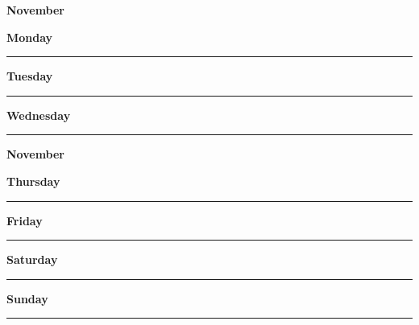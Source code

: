 \newpage

\textbf{\Large{November} \hfill \Large{}}
\vspace{0.3cm}

\begin{daybox}
 \textbf{Monday} \\
\rule{\linewidth}{0.02cm}
\end{daybox}

\begin{daybox}
\textbf{Tuesday} \\
\rule{\linewidth}{0.02cm}
\end{daybox}

\begin{daybox}
\textbf{Wednesday} \\
\rule{\linewidth}{0.02cm}
\end{daybox}

\newpage

\textbf{\Large{November} \hfill \Large{}}
\vspace{0.3cm}

\begin{daybox}
\textbf{Thursday} \\
\rule{\linewidth}{0.02cm}
\end{daybox}

\begin{daybox}
\textbf{Friday} \\
\rule{\linewidth}{0.02cm}
\end{daybox}

\begin{weekendbox}
\textbf{Saturday} \\
\rule{\linewidth}{0.02cm}
\tcblower
{}
\textbf{Sunday} \\
\rule{\linewidth}{0.02cm}
\end{weekendbox}